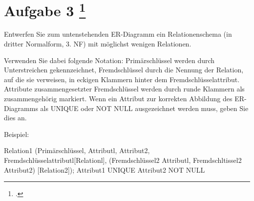 \documentclass{lehramt-informatik-aufgabe}
\begin{document}
\section{Aufgabe 3
\footcite{66116:2021:03}}

Entwerfen Sie zum untenstehenden ER-Diagramm ein Relationenschema (in
dritter Normalform, 3. NF) mit möglichst wenigen Relationen.

Verwenden Sie dabei folgende Notation: Primärschlüssel werden durch
Unterstreichen gekennzeichnet, Fremdschlüssel durch die Nennung der
Relation, auf die sie verweisen, in eckigen Klammern hinter dem
Fremdschlüsselattribut. Attribute zusammengesetzter Fremdschlüssel
werden durch runde Klammern als zusammengehörig markiert. Wenn ein
Attribut zur korrekten Abbildung des ER-Diagramms als UNIQUE oder NOT
NULL ausgezeichnet werden muss, geben Sie dies an.

Beispiel:

Relation1 (Primärschlüssel, Attributl, Attribut2,
Fremdschlüsselattributl[Relationl],
(Fremdschlüssel2 Attributl, Fremdschltissel2 Attribut2) [Relation2]);
Attribut1 UNIQUE
Attribut2 NOT NULL
\end{document}
